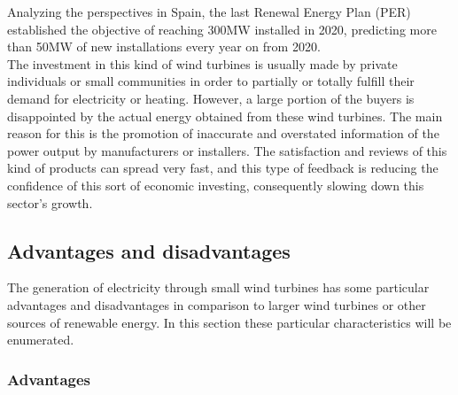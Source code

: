 \documentclass[../TFG_Report.tex]{subfiles}
\begin{document}
\FloatBarrier

Analyzing the perspectives in Spain, the last Renewal Energy Plan (PER) established the objective of reaching 300MW installed in 2020, predicting more than 50MW of new installations every year on from 2020. \cite{PER} \\

The investment in this kind of wind turbines is usually made by private individuals or small communities in order to partially or totally fulfill their demand for electricity or heating. However, a large portion of the buyers is disappointed by the actual energy obtained from these wind turbines. The main reason for this is the promotion of inaccurate and overstated information of the power output by manufacturers or installers. The satisfaction and reviews of this kind of products can spread very fast, and this type of feedback is reducing the confidence of this sort of economic investing, consequently slowing down this sector's growth. \cite{DesignControl}








 



\subsection{Advantages and disadvantages}

The generation of electricity through small wind turbines has some particular advantages and disadvantages in comparison to larger wind turbines or other sources of renewable energy. In this section these particular characteristics will be enumerated. \cite{Sanz} \cite{Apunts}

\subsubsection{Advantages}
\end{document}
